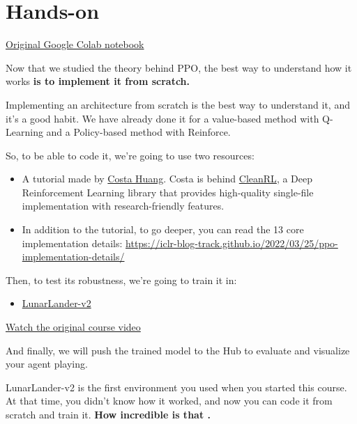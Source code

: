 \documentclass[11pt,a4paper]{article}
\begin{document}
\section{Hands-on}\label{hands-on}

\href{https://colab.research.google.com/github/huggingface/deep-rl-class/blob/main/notebooks/unit8/unit8_part1.ipynb}{Original Google Colab notebook}

Now that we studied the theory behind PPO, the best way to understand how it works \textbf{is to implement it from scratch.}

Implementing an architecture from scratch is the best way to understand it, and it's a good habit. We have already done it for a value-based method with Q-Learning and a Policy-based method with Reinforce.

So, to be able to code it, we're going to use two resources:

\begin{itemize}
\tightlist
\item
  A tutorial made by \href{https://github.com/vwxyzjn}{Costa Huang}. Costa is behind \href{https://github.com/vwxyzjn/cleanrl}{CleanRL}, a Deep Reinforcement Learning library that provides high-quality single-file implementation with research-friendly features.
\item
  In addition to the tutorial, to go deeper, you can read the 13 core implementation details: \url{https://iclr-blog-track.github.io/2022/03/25/ppo-implementation-details/}
\end{itemize}

Then, to test its robustness, we're going to train it in:

\begin{itemize}
\tightlist
\item
  \href{https://www.gymlibrary.ml/environments/box2d/lunar_lander/}{LunarLander-v2}
\end{itemize}

\href{https://github.com/huggingface/deep-rl-class/blob/main/assets/63_deep_rl_intro/lunarlander.mp4}{Watch the original course video}

And finally, we will push the trained model to the Hub to evaluate and visualize your agent playing.

LunarLander-v2 is the first environment you used when you started this course. At that time, you didn't know how it worked, and now you can code it from scratch and train it. \textbf{How incredible is that .}

\end{document}
